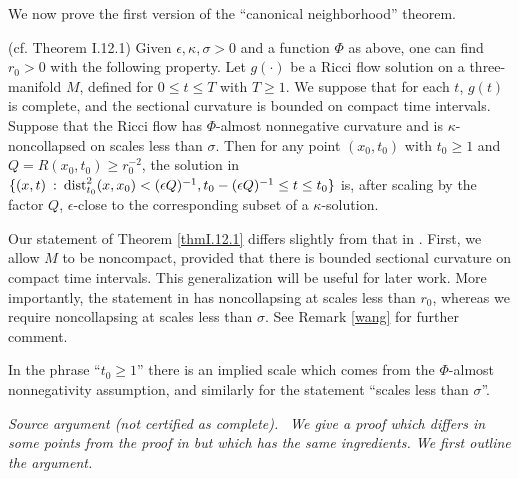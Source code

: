 We now prove the first version of the ``canonical neighborhood''
theorem.

\begin{theorem}
  \label{thm:kl-canonical-neighborhood-theorem-compactness-canonical-neighborhoods}
 (cf. Theorem I.12.1) \label{thmI.12.1}
Given $\epsilon, \kappa, \sigma > 0$ and a function $\Phi$ as above, one can
find $r_0 > 0$ with the following property.  Let $g(\cdot)$ be a Ricci flow
solution on a three-manifold $M$, defined for $0 \le t \le T$ with
$T \ge 1$. We suppose that for each $t$, $g(t)$ is complete,
and the sectional curvature is bounded on compact time intervals.
Suppose that the Ricci flow has
$\Phi$-almost nonnegative curvature and is $\kappa$-noncollapsed
on scales less than $\sigma$. Then for any point $(x_0, t_0)$ with $t_0 \ge 1$
and $Q = R(x_0, t_0) \ge r_0^{-2}$, the solution in
$\{(x,t) \: : \: \operatorname{dist}_{t_0}^2(x, x_0) < (\epsilon Q)^{-1}, t_0 - (\epsilon Q)^{-1}
\le t \le t_0\}$ is, after scaling by the factor $Q$, $\epsilon$-close to the
corresponding subset of a $\kappa$-solution.
\end{theorem}

\begin{remark}
  \label{rem:kl-canonical-neighborhood-theorem-existence-canonical-neighborhoods-5}
 \label{wangg}
Our statement of Theorem \ref{thmI.12.1} differs slightly from that
in \cite[Theorem 12.1]{Perelman}.
First, we allow $M$ to be noncompact, provided that
there is bounded sectional curvature on compact time intervals.
This generalization will be useful for later work.
More importantly, the statement in \cite[Theorem 12.1]{Perelman}
has noncollapsing at scales less than $r_0$, whereas we require
noncollapsing at scales less than $\sigma$. See Remark \ref{wang} for further
comment.

In the phrase ``$t_0 \ge 1$'' there is an implied scale which comes
from the $\Phi$-almost nonnegativity assumption, and similarly for the
statement  ``scales less than $\sigma$''.
\end{remark}
\par\medskip\noindent\textit{Source argument (not certified as complete).}\ \begingroup\itshape
We give a proof which differs in some points from the proof in
\cite{Perelman} but which has the same ingredients. We first outline
the argument.

